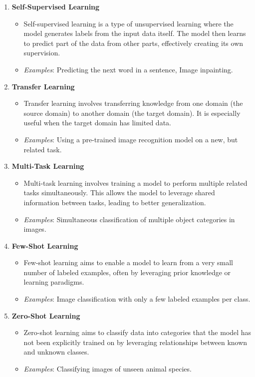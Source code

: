 \documentclass{article}
\begin{document}
\begin{enumerate}
    \item \textbf{Self-Supervised Learning}
    \begin{itemize}
        \item Self-supervised learning is a type of unsupervised learning where the model generates labels from the input data itself. The model then learns to predict part of the data from other parts, effectively creating its own supervision.
        \item \textit{Examples}: Predicting the next word in a sentence, Image inpainting.
    \end{itemize}

    \item \textbf{Transfer Learning}
    \begin{itemize}
        \item Transfer learning involves transferring knowledge from one domain (the source domain) to another domain (the target domain). It is especially useful when the target domain has limited data.
        \item \textit{Examples}: Using a pre-trained image recognition model on a new, but related task.
    \end{itemize}

    \item \textbf{Multi-Task Learning}
    \begin{itemize}
        \item Multi-task learning involves training a model to perform multiple related tasks simultaneously. This allows the model to leverage shared information between tasks, leading to better generalization.
        \item \textit{Examples}: Simultaneous classification of multiple object categories in images.
    \end{itemize}

    \item \textbf{Few-Shot Learning}
    \begin{itemize}
        \item Few-shot learning aims to enable a model to learn from a very small number of labeled examples, often by leveraging prior knowledge or learning paradigms.
        \item \textit{Examples}: Image classification with only a few labeled examples per class.
    \end{itemize}

    \item \textbf{Zero-Shot Learning}
    \begin{itemize}
        \item Zero-shot learning aims to classify data into categories that the model has not been explicitly trained on by leveraging relationships between known and unknown classes.
        \item \textit{Examples}: Classifying images of unseen animal species.
    \end{itemize}


\end{enumerate}
\end{document}
